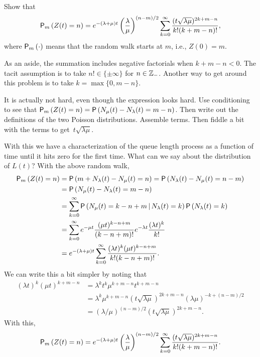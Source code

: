 \begin{exercise}  [\faCalculator]
Show that
\begin{equation*}
    \P{Z(t)=n}_m 
= e^{-(\lambda+\mu)t} \left(\frac\lambda\mu\right)^{(n-m)/2} \sum_{k=0}^\infty 
\frac{(t\sqrt{\lambda\mu} )^{2k+m-n}}{k!(k+m-n)!},
\end{equation*}
where $\P{\cdot}_m$ means that the random walk starts at $m$, i.e.,
$Z(0)=m$.

As an aside, the summation includes negative factorials when
$k+m-n<0$. The tacit assumption is to take $n!\in \{\pm \infty\}$ for
$n\in \mathbb{Z}_-$. Another way to get around this problem is to take
$k=\max\{0, m-n\}$.
\begin{hint}
It is actually not hard, even though the expression looks
  hard. Use conditioning to see that
  $\P{Z(t)=n}_m = \P{N_\mu(t) - N_\lambda(t) = m - n}$. Then write out
  the definitions of the two Poisson distributions. Assemble
  terms. Then fiddle a bit with the terms to get~$t\sqrt{\lambda\mu}$. 
\end{hint}
\begin{solution}
With this we have a characterization of the queue length process as a
function of time until it hits zero for the first time. What can we
say about the distribution of $L(t)$? With the above random walk, 
\begin{equation}\label{eq:29}
  \begin{split}
    \P{Z(t)=n}_m
&= \P{m+N_\lambda(t) - N_\mu(t) = n }  = \P{N_\lambda(t) - N_\mu(t) = n-m }  \\
&= \P{N_\mu(t) - N_\lambda(t) = m-n }  \\
&= \sum_{k=0}^\infty \P{N_\mu(t) = k - n + m\given N_\lambda(t) = k } \P{N_\lambda(t)=k}\\
&= \sum_{k=0}^\infty e^{-\mu t} \frac{(\mu t)^{k -n+m}}{(k-n +m)!} e^{-\lambda t} \frac{(\lambda t)^k}{k!} \\
&= e^{-(\lambda+\mu)t} \sum_{k=0}^\infty \frac{(\lambda t)^k(\mu t)^{k  -n + m }}{k!(k-n+m)!}.
  \end{split}
\end{equation}
We can write this a bit simpler by noting that
\begin{align*}
  (\lambda t)^k (\mu t) ^{k + m - n}  
&=  \lambda^k t^k\mu^{k + m - n} t^{k+m-n} \\
&= \lambda^k \mu^{k + m - n} (t\sqrt{\lambda \mu})^{2k+m-n} (\lambda\mu)^{-k + (n-m)/2} \\
&= (\lambda/\mu)^{(n-m)/2} (t\sqrt{\lambda \mu})^{2k+m-n}.
\end{align*}
With this,
\begin{equation*}
    \P{Z(t)=n}_m 
= e^{-(\lambda+\mu)t} \left(\frac\lambda\mu\right)^{(n-m)/2} \sum_{k=0}^\infty 
\frac{(t\sqrt{\lambda\mu} )^{2k+m-n}}{k!(k+m-n)!}.
\end{equation*}
\end{solution}
\end{exercise}


